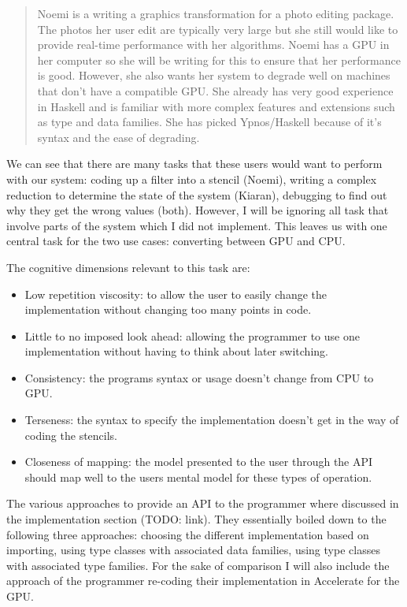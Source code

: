 \begin{quote}
Noemi is a writing a graphics transformation for a photo editing
package. The photos her user edit are typically very large but she still
would like to provide real-time performance with her algorithms. Noemi
has a GPU in her computer so she will be writing for this to ensure that
her performance is good. However, she also wants her system to degrade
well on machines that don't have a compatible GPU. She already has very
good experience in Haskell and is familiar with more complex features
and extensions such as type and data families. She has picked
Ypnos/Haskell because of it's syntax and the ease of degrading.
\end{quote}

We can see that there are many tasks that these users would want to
perform with our system: coding up a filter into a stencil (Noemi),
writing a complex reduction to determine the state of the system
(Kiaran), debugging to find out why they get the wrong values (both).
However, I will be ignoring all task that involve parts of the system
which I did not implement. This leaves us with one central task for the
two use cases: converting between GPU and CPU.

The cognitive dimensions relevant to this task are:

\begin{itemize}
\itemsep1pt\parskip0pt
\item
  Low repetition viscosity: to allow the user to easily change the
  implementation without changing too many points in code.
\item
  Little to no imposed look ahead: allowing the programmer to use one
  implementation without having to think about later switching.
\item
  Consistency: the programs syntax or usage doesn't change from CPU to
  GPU.
\item
  Terseness: the syntax to specify the implementation doesn't get in the
  way of coding the stencils.
\item
  Closeness of mapping: the model presented to the user through the API
  should map well to the users mental model for these types of
  operation.
\end{itemize}

The various approaches to provide an API to the programmer where
discussed in the implementation section (TODO: link). They essentially
boiled down to the following three approaches: choosing the different
implementation based on importing, using type classes with associated
data families, using type classes with associated type families. For the
sake of comparison I will also include the approach of the programmer
re-coding their implementation in Accelerate for the GPU.


